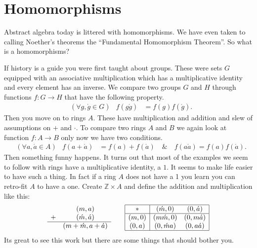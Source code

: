 \section{Homomorphisms}
Abstract algebra today is littered with homomorphisms. We have even taken to
calling Noether's theorems the ``Fundamental Homomorphism Theorem''.  So what 
is a homomorphisms?

If history is a guide you were first taught about groups. 
These were sets $G$ equipped with an associative multiplication 
which has a multiplicative identity and every element has an inverse.
We compare two groups $G$ and $H$ through functions $f:G\to H$ that 
have the following property.
\begin{align*}
    &(\forall g,\acute{g}\in G)
    &
    f(g\acute{g}) & = f(g)f(\acute{g}).
\end{align*}
Then you move on to rings $A$.  These have multiplication and addition 
and slew of assumptions on $+$ and $\cdot$.  To compare two rings 
$A$ and $B$ we again look at function $f:A\to B$ only now we have two 
conditions.
\begin{align*}
    &(\forall a,\acute{a}\in A)
    &
    f(a+\acute{a}) & = f(a)+f(\acute{a})\quad \& \quad
    f(a\acute{a})  = f(a)f(\acute{a}).
\end{align*}
Then something funny happens.  It turns out that most of the examples 
we seem to follow with rings have a multiplicative identity, a $1$.
It seems to make life easier to have such a thing.  In fact if a ring 
$A$ does not have a 1 you learn you can retro-fit $A$ to have a one.
Create $\mathbb{Z}\times A$ and define the addition and multiplication
like this:
\begin{align*}
    \begin{array}{cc}
        & (m,a)\\
    + &    (\acute{m},\acute{a})\\
    \hline
        & (m+\acute{m}, a+\acute{a})
    \end{array}
    \qquad 
    \begin{array}{|c|cc|}
        \hline 
        * & (\acute{m},0) & (0,\acute{a})\\
        \hline 
        (m,0) & (m\acute{m},0) & (0,m\acute{a})\\
        (0,a) & (0,\acute{m}a) & (0,a\acute{a})\\
    \hline
    \end{array}
\end{align*}
Its great to see this work but there are some things that should 
bother you.  

